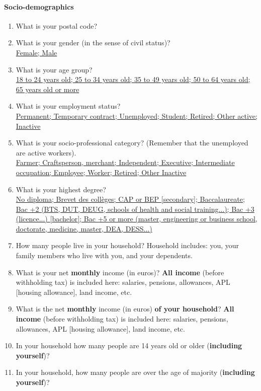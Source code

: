 \documentclass[english,5p,authoryear]{elsarticle}
\begin{document}
\begin{appendices}
\paragraph{Socio-demographics}
\begin{enumerate}[resume,leftmargin=*]
\item What is your postal code? 
\item What is your gender (in the sense of civil status)? \uline{}\\
\uline{Female; Male }
\item What is your age group? \uline{}\\
\uline{18 to 24 years old; 25 to 34 years old; 35 to 49 years old;
50 to 64 years old; 65 years old or more} 
\item What is your employment status? \uline{}\\
\uline{Permanent; Temporary contract; Unemployed; Student; Retired;
Other active; Inactive}
\item What is your socio-professional category? (Remember that the unemployed
are active workers). \uline{}\\
\uline{Farmer; Craftsperson, merchant; Independent; Executive; Intermediate
occupation; Employee; Worker; Retired; Other Inactive} 
\item What is your highest degree? \uline{}\\
\uline{No diploma; Brevet des collèges; CAP or BEP {[}secondary{]};
Baccalaureate; Bac +2 (BTS, DUT, DEUG, schools of health and social
training...); Bac +3 (licence...) {[}bachelor{]}; Bac +5 or more (master,
engineering or business school, doctorate, medicine, master, DEA,
DESS...)}
\item How many people live in your household? Household includes: you, your
family members who live with you, and your dependents. 
\item What is your net \textbf{\textbf{monthly}} income (in euros)? \textbf{\textbf{All
income}} (before withholding tax) is included here: salaries, pensions,
allowances, APL {[}housing allowance{]}, land income, etc. 
\item What is the net \textbf{\textbf{monthly}} income (in euros) \textbf{\textbf{of
your household}}? \textbf{\textbf{All income}} (before withholding
tax) is included here: salaries, pensions, allowances, APL {[}housing
allowance{]}, land income, etc. 
\item In your household how many people are 14 years old or older (\textbf{\textbf{including
yourself}})? 
\item In your household, how many people are over the age of majority (\textbf{\textbf{including
yourself}})? 
\end{enumerate}


\end{appendices}
\end{document}
